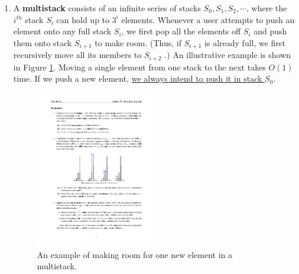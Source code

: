 \documentclass[12pt,a4paper]{article}
\theoremstyle{definition}
\begin{document}
\begin{enumerate}
\begin{proof}
    We can meet the requirement $\Phi(S_n) \geq \Phi(S_0)$, because our potential function satisfies that $\Phi(S) \geq 0$ and the initial state satisfies that $\Phi(S_0) = 0$.

    Therefore the amortized cost of a TABLE-DELETE that uses this strategy is bounded above by a constant $3$.
    \end{proof}
    \clearpage

	\item A \textbf{multistack} consists of an infinite series of stacks $S_0, S_1, S_2,\cdots$, where the $i^{th}$ stack $S_i$ can hold up to $3^i$ elements. Whenever a user attempts to push an element onto any full stack $S_i$, we first pop all the elements off $S_i$ and push them onto stack $S_{i+1}$ to make room. (Thus, if $S_{i+1}$ is already full, we first recursively move all its members to $S_{i+2}$ .) An illustrative example is shown in Figure \ref{Fig-MultiStack}. Moving a single element from one stack to the next takes $O(1)$ time. If we push a new element, \underline{we always intend to push it in stack $S_0$}.

	\begin{figure}[!htbp]
	\centering
	\includegraphics[width=0.5\textwidth]{Fig-MultiStack.pdf}
	\caption{An example of making room for one new element in a multistack.}
	\label{Fig-MultiStack}
	\end{figure}


\end{enumerate}
\end{document}

